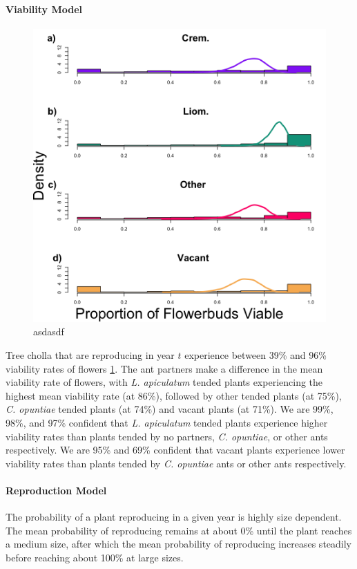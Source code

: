 \documentclass[11pt]{article}
\begin{document}
\paragraph{Viability Model}
\begin{figure}[H]
	\includegraphics[width=0.95\linewidth]{Figures/ViabHist.png}
	\caption{asdasdf}
	\label{fig:viab}
\end{figure}
Tree cholla that are reproducing in year $t$ experience between 39\% and 96\% viability rates of flowers \ref{fig:viab}.
The ant partners make a difference in the mean viability rate of flowers, with \textit{L. apiculatum} tended plants experiencing the highest mean viability rate (at 86\%), followed by other tended plants (at 75\%), \textit{C. opuntiae} tended plants (at 74\%) and vacant plants (at 71\%).
We are 99\%, 98\%, and 97\% confident that \textit{L. apiculatum} tended plants experience higher viability rates than plants tended by no partners, \textit{C. opuntiae}, or other ants respectively.
We are 95\% and 69\% confident that vacant plants experience lower viability rates than plants tended by \textit{C. opuntiae} ants or other ants respectively.

\paragraph{Reproduction Model}
The probability of a plant reproducing in a given year is highly size dependent. 
The mean probability of reproducing remains at about 0\% until the plant reaches a medium size, after which the mean probability of reproducing increases steadily before reaching about 100\% at large sizes. 
\end{document}
